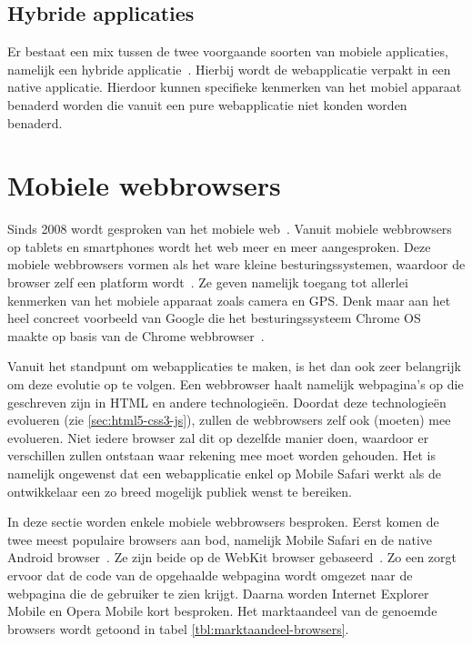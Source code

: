 \subsection{Hybride applicaties}
Er bestaat een mix tussen de twee voorgaande soorten van mobiele applicaties, namelijk een hybride applicatie~\cite{Accenture2012}. 
Hierbij wordt de webapplicatie verpakt in een native applicatie. 
Hierdoor kunnen specifieke kenmerken van het mobiel apparaat benaderd worden die vanuit een pure webapplicatie niet konden worden benaderd.


\section{Mobiele webbrowsers}
\label{sec:mobiele-webbrowsers}
Sinds 2008 wordt gesproken van het mobiele web~\cite{Hales2012}. 
Vanuit mobiele webbrowsers op tablets en smartphones wordt het web meer en meer aangesproken. 
Deze mobiele webbrowsers vormen als het ware kleine besturingssystemen, waardoor de browser zelf een platform wordt~\cite{Hales2012}. 
Ze geven namelijk toegang tot allerlei kenmerken van het mobiele apparaat zoals camera en GPS. 
Denk maar aan het heel concreet voorbeeld van Google die het besturingssysteem Chrome OS maakte op basis van de Chrome webbrowser~\cite{Hales2012}.

Vanuit het standpunt om webapplicaties te maken, is het dan ook zeer belangrijk om deze evolutie op te volgen. 
Een webbrowser haalt namelijk webpagina's op die geschreven zijn in HTML en andere technologieën. 
Doordat deze technologieën evolueren (zie \ref{sec:html5-css3-js}), zullen de webbrowsers zelf ook (moeten) mee evolueren. 
Niet iedere browser zal dit op dezelfde manier doen, waardoor er verschillen zullen ontstaan waar  rekening mee moet worden gehouden. 
Het is namelijk ongewenst dat een webapplicatie enkel op Mobile Safari werkt als de ontwikkelaar een zo breed mogelijk publiek wenst te bereiken. 

In deze sectie worden enkele mobiele webbrowsers besproken. 
Eerst komen de twee meest populaire browsers aan bod, namelijk Mobile Safari en de native Android browser~\cite{Hales2012}. 
Ze zijn beide op de WebKit browser  gebaseerd~\cite{Oeflman2011}. 
Zo een  zorgt ervoor dat de code van de opgehaalde webpagina wordt omgezet naar de webpagina die de gebruiker te zien krijgt. 
Daarna worden Internet Explorer Mobile en Opera Mobile kort besproken. 
Het marktaandeel van de genoemde browsers wordt getoond in tabel \ref{tbl:marktaandeel-browsers}.

